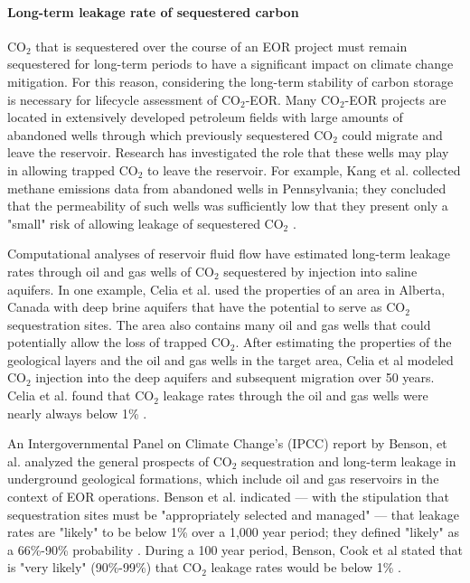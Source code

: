 \documentclass[11pt]{report}
\begin{document}
\paragraph{Long-term leakage rate of sequestered carbon} \label{par:LongTermLeakageRate}
CO$_2$ that is sequestered over the course of an EOR project must remain sequestered for long-term periods to have a significant impact on climate change mitigation. For this reason, considering the long-term stability of carbon storage is necessary for lifecycle assessment of CO$_2$-EOR.  Many CO$_2$-EOR projects are located in extensively developed petroleum fields with large amounts of abandoned wells through which previously sequestered CO$_2$ could migrate and leave the reservoir. Research has investigated the role that these wells may play in allowing trapped CO$_2$ to leave the reservoir. For example, Kang et al. collected methane emissions data from abandoned wells in Pennsylvania; they concluded that the permeability of such wells was sufficiently low that they present only a "small" risk of allowing leakage of sequestered CO$_2$ \cite{Kang2015}.  

Computational analyses of reservoir fluid flow have estimated long-term leakage rates through oil and gas wells of CO$_2$ sequestered by injection into saline aquifers. In one example, Celia et al. \cite{Celia2011} used the properties of an area in Alberta, Canada with deep brine aquifers that have the potential to serve as CO$_2$ sequestration sites. The area also contains many oil and gas wells that could potentially allow the loss of trapped CO$_2$. After estimating the properties of the geological layers and the oil and gas wells in the target area, Celia et al modeled CO$_2$ injection into the deep aquifers and subsequent migration over 50 years. Celia et al. found that CO$_2$ leakage rates through the oil and gas wells were nearly always below 1\%  \cite{Celia2011}.

An Intergovernmental Panel on Climate Change's (IPCC) report by Benson, et al. \cite{Benson2005} analyzed the general prospects of CO$_2$ sequestration and long-term leakage in underground geological formations, which include oil and gas reservoirs in the context of EOR operations. Benson et al. indicated --- with the stipulation that sequestration sites must be "appropriately selected and managed" --- that leakage rates are "likely" to be below 1\% over a 1,000 year period; they defined "likely" as a 66\%-90\% probability \cite{Benson2005}. During a 100 year period, Benson, Cook et al stated that is "very likely" (90\%-99\%) that CO$_2$ leakage rates would be below 1\% \cite{Benson2005}.
\end{document}
